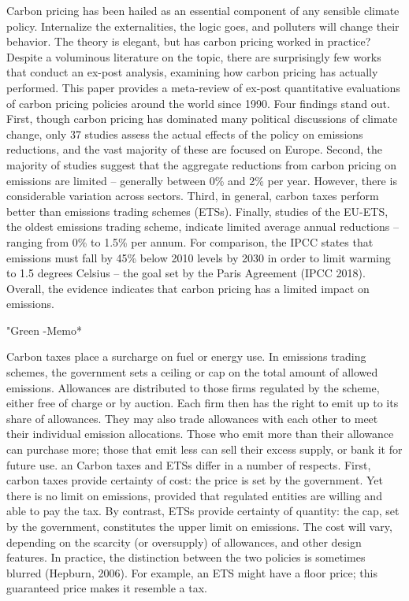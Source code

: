 \documentclass[
]{book}
\begin{document}
Carbon pricing has been hailed as an essential component of any sensible climate policy. Internalize the externalities, the logic goes, and polluters will change their behavior. The theory is elegant, but has carbon pricing worked in practice? Despite a voluminous literature on the topic, there are surprisingly few works that conduct an ex-post analysis, examining how carbon pricing has actually performed. This paper provides a meta-review of ex-post quantitative evaluations of carbon pricing policies around the world since 1990. Four findings stand out. First, though carbon pricing has dominated many political discussions of climate change, only 37 studies assess the actual effects of the policy on emissions reductions, and the vast majority of these are focused on Europe. Second, the majority of studies suggest that the aggregate reductions from carbon pricing on emissions are limited -- generally between 0\% and 2\% per year. However, there is considerable variation across sectors. Third, in general, carbon taxes perform better than emissions trading schemes (ETSs). Finally, studies of the EU-ETS, the oldest emissions trading scheme, indicate limited average annual reductions -- ranging from 0\% to 1.5\% per annum. For comparison, the IPCC states that emissions must fall by 45\% below 2010 levels by 2030 in order to limit warming to 1.5 degrees Celsius -- the goal set by the Paris Agreement (IPCC 2018). Overall, the evidence indicates that carbon pricing has a limited impact on emissions.

"Green -Memo*

Carbon taxes place a surcharge on fuel or energy use. In emissions trading schemes, the
government sets a ceiling or cap on the total amount of allowed emissions. Allowances are
distributed to those firms regulated by the scheme, either free of charge or by auction. Each
firm then has the right to emit up to its share of allowances. They may also trade allowances
with each other to meet their individual emission allocations. Those who emit more than their
allowance can purchase more; those that emit less can sell their excess supply, or bank it for
future use.
an
Carbon taxes and ETSs differ in a number of respects. First, carbon taxes provide certainty of
cost: the price is set by the government. Yet there is no limit on emissions, provided that
regulated entities are willing and able to pay the tax. By contrast, ETSs provide certainty of
quantity: the cap, set by the government, constitutes the upper limit on emissions. The cost
will vary, depending on the scarcity (or oversupply) of allowances, and other design features. In
practice, the distinction between the two policies is sometimes blurred (Hepburn, 2006). For
example, an ETS might have a floor price; this guaranteed price makes it resemble a tax.
\end{document}
